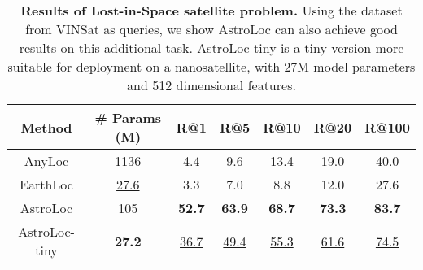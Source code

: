 
\begin{table}
\begin{center}
\begin{adjustbox}{width=0.9\columnwidth}
\begin{tabular}{c|c|ccccc}
\toprule
Method & \# Params (M) & R@1 & R@5 & R@10 & R@20 & R@100 \\
\midrule
AnyLoc        & 1136 &4.4 &  9.6 & 13.4 & 19.0 & 40.0 \\
EarthLoc      & \underline{27.6} &3.3 &  7.0 &  8.8 & 12.0 & 27.6 \\
AstroLoc      & 105 &\textbf{52.7} & \textbf{63.9} & \textbf{68.7} & \textbf{73.3} & \textbf{83.7}\\
AstroLoc-tiny & \textbf{27.2} &\underline{36.7} & \underline{49.4} & \underline{55.3} & \underline{61.6} & \underline{74.5} \\
\bottomrule
\end{tabular}
\end{adjustbox}
\end{center}
\vspace{-5mm}
\caption{\textbf{Results of Lost-in-Space satellite problem.} Using the dataset from VINSat \cite{McCleary_2024_vinsat} as queries, we show AstroLoc can also achieve good results on this additional task. AstroLoc-tiny is a tiny version more suitable for deployment on a nanosatellite, with 27M model parameters and 512 dimensional features.}
\vspace{-5mm}
\label{tab:vinsat}
\end{table}

